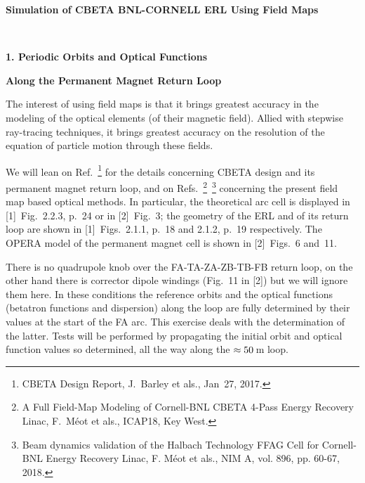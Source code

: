 \documentclass[10pt]{article}
\begin{document}
\thispagestyle{empty}

\begin{minipage}{1.\linewidth}
\bf
\vspace{-2ex}
  
\vspace{-2ex}
  
\vspace{-2ex}
  
\end{minipage}


\vspace{5ex}

\centerline{\LARGE \bf
  Simulation of CBETA BNL-CORNELL ERL Using Field Maps
}

~

\centerline{\LARGE \bf
1. Periodic Orbits and Optical Functions 
}

\centerline{\LARGE \bf
  Along the Permanent Magnet Return Loop
}

\vspace{5ex}
\author{
F.~M\'eot
\\
Collider-Accelerator Department, BNL, Upton, NY 11973 \\
}


The interest of using field maps is that it brings greatest accuracy in the modeling of the optical elements (of their magnetic field). Allied with stepwise ray-tracing techniques, it brings greatest accuracy on
the resolution of the equation of particle motion through these fields. 

We will lean on Ref.~\footnote{CBETA Design Report, J.~Barley et als., Jan~27, 2017.} 
for the details concerning CBETA design and its permanent magnet return loop, 
and on Refs.~\footnote{A Full Field-Map Modeling of Cornell-BNL CBETA 4-Pass Energy Recovery Linac, F.~M\'eot et als., ICAP18, Key West.}~\footnote{Beam dynamics validation of the Halbach Technology FFAG Cell for Cornell-BNL Energy Recovery Linac, F. Méot et als., NIM A, vol. 896, pp. 60-67, 2018.} concerning the present field map based optical methods. 
In particular, the theoretical arc cell is displayed in [1]~Fig.~2.2.3, p.~24 or in [2]~Fig.~3; the geometry of the ERL and of its return loop are shown in [1]~Figs.~2.1.1, p.~18 and 2.1.2, p.~19 respectively. The OPERA model of the permanent magnet cell is shown in [2]~Figs.~6 and~11.

There is no quadrupole knob over the FA-TA-ZA-ZB-TB-FB return loop, on the other hand there is corrector dipole windings
(Fig.~11 in [2]) but we will ignore them here. 
In these conditions the reference orbits and the optical functions (betatron functions and dispersion)
along the loop are fully determined by their values at the start of the FA arc.
This exercise deals with the determination of the latter.
Tests will be performed by propagating the initial orbit and optical function values so determined, 
all the way along the $\rm \approx 50$\,m loop.
\end{document}
